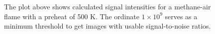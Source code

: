 \begin{figure}

\centering



\caption[Methane-air flame results - II]{The plot above shows calculated signal intensities for a methane-air flame with a preheat of 500 K. The ordinate \(1\times10^9\) serves as a minimum threshold to get images with usable signal-to-noise ratios.}

\label{fig:01-500}

\end{figure}
